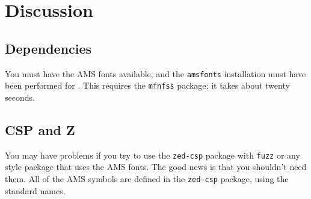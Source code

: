 \documentclass[12pt]{article}
\begin{document}

\section{Discussion}

\subsection{Dependencies}

You must have the AMS fonts available, and the {\tt amsfonts}
installation must have been performed for \LaTeXe.  This requires the
{\tt mfnfss} package; it takes about twenty seconds. 

\subsection{CSP and Z}

You may have problems if you try to use the {\tt zed-csp} package with
{\tt fuzz} or any style package that uses the AMS fonts.  The good
news is that you shouldn't need them.  All of the AMS symbols are
defined in the {\tt zed-csp} package, using the standard names.  

\end{document}
